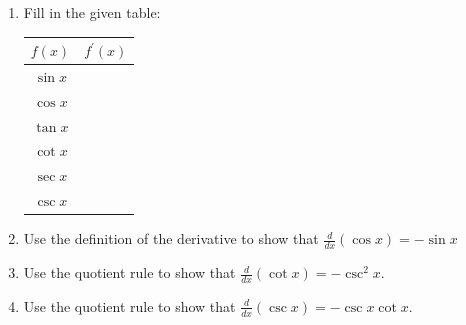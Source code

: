 \documentclass[12pt]{article}
\newif\ifans
\begin{document}
\begin{enumerate}

\item Fill in the given table:

\begin{center}
\begin{tabular}{c|c}
$f(x)$ & $f^{\prime}(x)$\\
\hline
$\sin{x}$ &  \\
\hline
$\cos{x}$ & \\
\hline
$\tan{x}$ & \\
\hline
$\cot{x}$ & \\
\hline
$\sec{x}$ & \\
\hline
$\csc{x}$ & 
\end{tabular}
\end{center}

\ifans{\fbox{
\begin{tabular}{c|c}
$f(x)$ & $f^{\prime}(x)$\\
\hline
$\sin{x}$ & $\cos{x}$  \\
\hline
$\cos{x}$ & $-\sin{x}$ \\
\hline
$\tan{x}$ & $\sec^2{x}$\\
\hline
$\cot{x}$ & $-\csc^2{x}$\\
\hline
$\sec{x}$ & $\sec{x}\tan{x}$\\
\hline
$\csc{x}$ & $-\csc{x}\cot{x}$ 
\end{tabular}
}} \fi

\item Use the definition of the derivative to show that $\frac{d}{dx}(\cos{x})=-\sin{x}$

\ifans{\fbox{\parbox{0.5\linewidth}{
\begin{align*}
\frac{d}{dx}(\cos{x})&=\lim_{h \rightarrow 0}{\frac{\cos{(x+h)}-\cos{x}}{h}}\\
&=\lim_{h \rightarrow 0}{\frac{\cos{x}\cos{h}-\sin{x}\sin{h}-\cos{x}}{h}}\\
&=\lim_{h \rightarrow 0}{\left(\frac{\cos{x}\cos{h}-\cos{x}}{h}-\frac{\sin{x}\sin{h}}{h}\right)}\\
&=\lim_{h \rightarrow 0}{\left(\cos{x}\frac{\cos{h}-1}{h}-\sin{x}\frac{\sin{h}}{h}\right)}\\
&=(\cos{x})(0)-(\sin{x})(1)\\
&=-\sin{x}
\end{align*}
}}} \fi
\item Use the quotient rule to show that $\frac{d}{dx}(\cot{x})=-\csc^2{x}$.

\ifans{\fbox{\parbox{0.5\linewidth}{
\begin{align*}
\frac{d}{dx}(\cot{x})&=\frac{d}{dx}\left(\frac{\cos{x}}{\sin{x}}\right)\\
&=\frac{(\sin{x})(-\sin{x})-(\cos{x})(\cos{x})}{\sin^2{x}}\\
&=\frac{-(\sin^2{x}+\cos^2{x})}{\sin^2{x}}\\
&=-\frac{1}{\sin^2{x}}\\
&=-\csc^2{x}
\end{align*}
}}} \fi
\item Use the quotient rule to show that $\frac{d}{dx}(\csc{x})=-\csc{x}\cot{x}$.


\end{enumerate}
\end{document}
